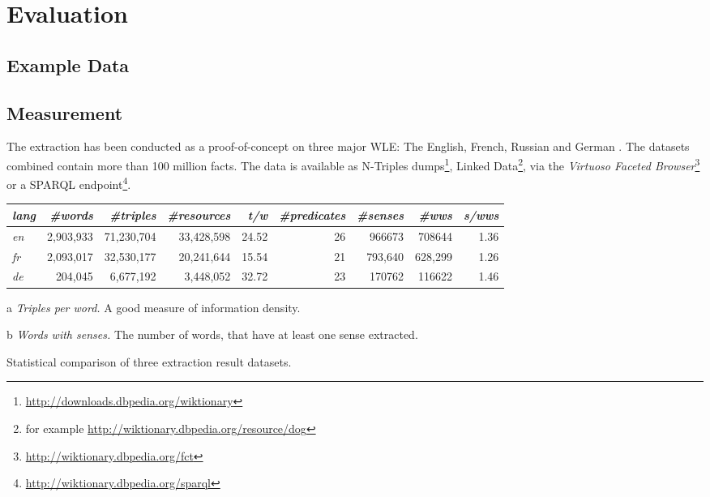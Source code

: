 \section{Evaluation}
\label{sec:evaluation}

\subsection{Example Data}

\subsection{Measurement}

The extraction has been conducted as a proof-of-concept on three major WLE:
The English, French, Russian and German \wik.
The datasets combined contain more than 100 million facts.
The data is available as N-Triples dumps\footnote{\url{http://downloads.dbpedia.org/wiktionary}}, Linked Data\footnote{for example \url{http://wiktionary.dbpedia.org/resource/dog}}, via the \emph{Virtuoso Faceted Browser}\footnote{\url{http://wiktionary.dbpedia.org/fct}} or a SPARQL endpoint\footnote{\url{http://wiktionary.dbpedia.org/sparql}}.

\begin{threeparttable} 
\begin{tabular}{|l|r|r|r|r|r|r|r|r|}
\hline \emph{lang} & \emph{\#words} & \emph{\#triples} & \emph{\#resources} & \emph{t/w}\tnote{a}\hspace{0.15cm} & \emph{\#predicates} & \emph{\#senses} & \emph{\#wws}\tnote{b}\hspace{0.15cm} & \emph{s/wws} \\ 
\hline \hline \textit{en} & 2,903,933 & 71,230,704 & 33,428,598 & 24.52 & 26 & 966673 & 708644 & 1.36 \\ 
\hline \textit{fr} & 2,093,017 & 32,530,177 & 20,241,644 & 15.54 & 21 & 793,640 & 628,299 & 1.26 \\ 
\hline \textit{de} & 204,045 & 6,677,192 & 3,448,052 & 32.72 & 23 & 170762 & 116622 & 1.46 \\ 
\hline 
\end{tabular}
\begin{tablenotes}\footnotesize 
\item[a] \textit{Triples per word.} A good measure of information density.
\item[b] \textit{Words with senses.} The number of words, that have at least one sense  extracted.
\end{tablenotes}
\caption{Statistical comparison of three \wik extraction result datasets.}
\end{threeparttable}

